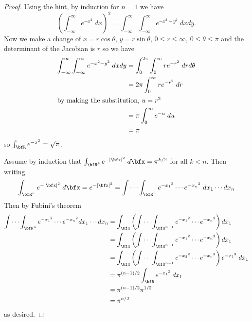 \begin{proof}
Using the hint, by induction for $n=1$ we have
\begin{equation}
\label{eq:e-x^2-n-1}
\left(\int_{-\infty}^\infty e^{-x^2}\;dx\right)^2
=\int_{-\infty}^\infty\int_{-\infty}^\infty e^{-x^2-y^2}\;dxdy.
\end{equation}
Now we make a change of $x=r\cos\theta$, $y=r\sin\theta$, $0\leq
r\leq\infty$, $0\leq\theta\leq\pi$ and the determinant of the Jacobian is
$r$ so we have
\begin{align*}
\int_{-\infty}^\infty\int_{-\infty}^\infty e^{-x^2-y^2}\;dxdy
&=\int_{0}^{2\pi}\int_{0}^\infty re^{-r^2}\;drd\theta\\
&=2\pi\int_0^\infty re^{-r^2}\;dr\\
\intertext{by making the substitution, $u=r^2$}
&=\pi\int_0^\infty e^{-u}\;du\\
&=\pi
\end{align*}
so $\int_\bfR e^{-x^2}=\sqrt{\pi}$.

Assume by induction that $\int_{\bfR^k}e^{-|\bfx|^2}\;d\bfx=\pi^{k/2}$ for
all $k<n$. Then writing
\begin{equation}
\label{eq:e-x^n-boldface}
\int_{\bfR^n}e^{-|\bfx|^2}\;d\bfx=
e^{-|\bfx|^2}=\idotsint_{\bfR^n}e^{-{x_1}^2}\cdots e^{-{x_n}^2}\;dx_1\cdots dx_n
\end{equation}
Then by Fubini's theorem
\begin{align*}
\idotsint_{\bfR^n}e^{-{x_1}^2}\cdots e^{-{x_n}^2}dx_1\cdots dx_n
&=\int_\bfR\left(\idotsint_{\bfR^{n-1}}e^{-{x_1}^2}\cdots e^{-{x_n}^2}\right)dx_1\\
&=\int_\bfR\left(\idotsint_{\bfR^{n-1}}e^{-{x_1}^2}\cdots
  e^{-{x_n}^2}\right)dx_1\\
&=\int_\bfR\left(\idotsint_{\bfR^{n-1}}e^{-{x_2}^2}\cdots
  e^{-{x_n}^2}\right)e^{-{x_1}^2}\;dx_1\\
&=\pi^{(n-1)/2}\int_\bfR e^{-{x_1}^2}\;dx_1\\
&=\pi^{(n-1)/2}\pi^{1/2}\\
&=\pi^{n/2}
\end{align*}
as desired.
\end{proof}

